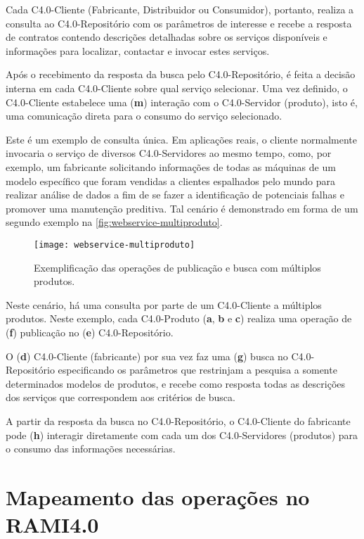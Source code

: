 Cada C4.0-Cliente (Fabricante, Distribuidor ou Consumidor), portanto, realiza a consulta ao C4.0-Repositório com os parâmetros de interesse e recebe a resposta de contratos contendo descrições detalhadas sobre os serviços disponíveis e informações para localizar, contactar e invocar estes serviços.

Após o recebimento da resposta da busca pelo C4.0-Repositório, é feita a decisão interna em cada C4.0-Cliente sobre qual serviço selecionar. Uma vez definido, o C4.0-Cliente estabelece uma (\textbf{m}) interação com o C4.0-Servidor (produto), isto é, uma comunicação direta para o consumo do serviço selecionado.

Este é um exemplo de consulta única. Em aplicações reais, o cliente normalmente invocaria o serviço de diversos C4.0-Servidores ao mesmo tempo, como, por exemplo, um fabricante solicitando informações de todas as máquinas de um modelo específico que foram vendidas a clientes espalhados pelo mundo para realizar análise de dados a fim de se fazer a identificação de potenciais falhas e promover uma manutenção preditiva. Tal cenário é demonstrado em forma de um segundo exemplo na \autoref{fig:webservice-multiproduto}.

\begin{figure}[htb]
	\centering
	\texttt{[image: webservice-multiproduto]}
	\caption{Exemplificação das operações de publicação e busca com múltiplos produtos.}
	\label{fig:webservice-multiproduto}
\end{figure}

Neste cenário, há uma consulta por parte de um C4.0-Cliente a múltiplos produtos. Neste exemplo, cada C4.0-Produto (\textbf{a}, \textbf{b} e \textbf{c}) realiza uma operação de (\textbf{f}) publicação no (\textbf{e}) C4.0-Repositório.

O (\textbf{d}) C4.0-Cliente (fabricante) por sua vez faz uma (\textbf{g}) busca no C4.0-Repositório especificando os parâmetros que restrinjam a pesquisa a somente determinados modelos de produtos, e recebe como resposta todas as descrições dos serviços que correspondem aos critérios de busca.

A partir da resposta da busca no C4.0-Repositório, o C4.0-Cliente do fabricante pode (\textbf{h}) interagir diretamente com cada um dos C4.0-Servidores (produtos) para o consumo das informações necessárias.

\section{Mapeamento das operações no RAMI4.0}
\label{sec:mapeamento-das-operacoes}

